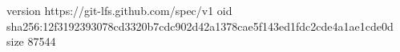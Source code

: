 version https://git-lfs.github.com/spec/v1
oid sha256:12f3192393078cd3320b7cdc902d42a1378cae5f143ed1fdc2cde4a1ae1cde0d
size 87544
